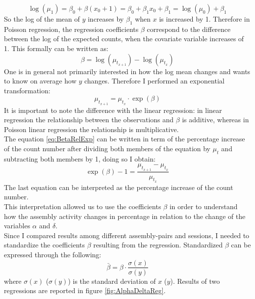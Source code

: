 \begin{equation*}
    \log(\mu_1)=\beta_0+\beta(x_0+1)=\beta_0+\beta_1x_0+\beta_1=\log(\mu_0)+\beta_1
    \label{eq:betaCoeff1}
\end{equation*}
So the log of the mean of $y$ increases by $\beta_1$ when $x$ is increased by 1. Therefore in Poisson regression, the regression coefficients $\beta$ correspond to the difference between the log of the expected counts, when the covariate variable increases of 1. This formally can be written as:
\begin{equation}
    \beta=\log(\mu_{t_{x+1}})-\log(\mu_{t_{x}})
    \label{eq:BetaRelLog}
\end{equation}
One is in general not primarily interested in how the log mean changes and wants to know on average how $y$ changes. Therefore I performed an exponential transformation:
\begin{equation}
    \mu_{t_{x+1}}=\mu_{t_x}\cdot \exp(\beta)
    \label{eq:BetaRelExp}
\end{equation}
It is important to note the difference with the linear regression: in linear regression the relationship between the observations and $\beta$ is additive, whereas in Poisson linear regression the relationship is multiplicative.\\The equation \ref{eq:BetaRelExp} can be written in term of the percentage increase of the count number after dividing both members of the equation by $\mu_t$ and subtracting both members by 1, doing so I obtain:
\begin{equation}
\exp(\beta)-1=\frac{\mu_{t_{x+1}}-\mu_{t_x}}{\mu_{t_x}}
    \label{eq:BetaPerc}
\end{equation}
The last equation can be interpreted as the percentage increase of the count number.\\This interpretation allowed us to use the coefficients $\beta$ in order to understand how the assembly activity changes in percentage in relation to the change of the variables $\alpha$ and $\delta$.\\Since I compared results among different assembly-pairs and sessions, I needed to standardize the coefficients $\beta$ resulting from the regression. Standardized $\beta$ can be expressed through the following:
\begin{equation}
    \bar{\beta}=\beta\cdot\frac{\sigma(x)}{\sigma(y)}
    \label{eq:betaStand}
\end{equation}
where $\sigma(x)$ ($\sigma(y)$) is the standard deviation of $x$ ($y$).
Results of two regressions are reported in figure \ref{fig:AlphaDeltaReg}.\\
